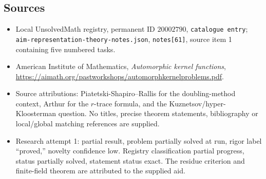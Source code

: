 \documentclass[11pt]{article}
\begin{document}
\subsection{Sources}
\begin{itemize}
\item Local UnsolvedMath registry, permanent ID $20002790$, \texttt{catalogue entry}; \texttt{aim-representation-theory-notes.json}, \texttt{notes[61]}, source item 1 containing five numbered tasks.
\item American Institute of Mathematics, \emph{Automorphic kernel functions}, \url{https://aimath.org/pastworkshops/automorphkernelproblems.pdf}.
\item Source attributions: Piatetski-Shapiro--Rallis for the doubling-method context, Arthur for the $r$-trace formula, and the Kuznetsov/hyper-Kloosterman question. No titles, precise theorem statements, bibliography or local/global matching references are supplied.
\item Research attempt 1: partial result, problem partially solved at run, rigor label ``proved,'' novelty confidence low. Registry classification partial progress, status partially solved, statement status exact. The residue criterion and finite-field theorem are attributed to the supplied aid.
\end{itemize}
\end{document}
